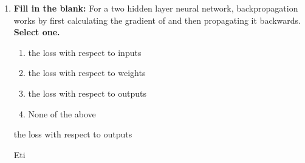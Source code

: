\begin{enumerate}
    
    \item \textbf{Fill in the blank:} For a two hidden layer neural network, backpropagation works by first calculating the gradient of \underline{\hspace{1cm}} and then propagating it backwards. 
    \textbf{Select one.}
    \begin{enumerate}
        \item the loss with respect to inputs
        \item the loss with respect to weights
        \item the loss with respect to outputs
        \item None of the above
     \end{enumerate}
    
    \begin{soln}
        the loss with respect to outputs
    \end{soln}
    
    \begin{qauthor}
    Eti  
    \end{qauthor}
    
\end{enumerate}